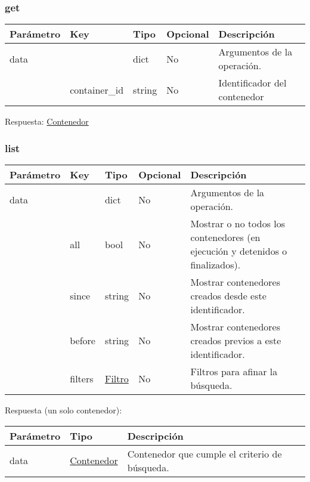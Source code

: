 		\pagebreak
		\subsubsection{get}
			\begin{table}[h!]
				\centering
	\begin{adjustbox}{max width=\textwidth}
				\begin{tabular}{|l|l|l|l|l|}
					\hline
					Parámetro & Key & Tipo & Opcional & Descripción \\ \hline
					data &  & dict & No & Argumentos de la operación. \\ \hline
					& container\_id & string & No & Identificador del contenedor \\ \hline
				\end{tabular}
\end{adjustbox}
			\end{table}
		
			Respuesta: \hyperref[sec:contenedor]{Contenedor}
			
		\subsubsection{list}
			\begin{table}[h!]
				\centering
	\begin{adjustbox}{max width=\textwidth}
				\begin{tabularx}{\linewidth}{|l|l|l|l|L|}
					\hline
					Parámetro & Key & Tipo & Opcional & Descripción \\ \hline
					data &  & dict & No & Argumentos de la operación. \\ \hline
					& all & bool & No & Mostrar o no todos los contenedores (en ejecución y detenidos o finalizados). \\ \hline
					& since & string & No & Mostrar contenedores creados desde este identificador. \\ \hline
					& before & string & No & Mostrar contenedores creados previos a este identificador. \\ \hline
					& filters & \hyperref[sec:filtrocontenedor]{Filtro} & No & Filtros para afinar la búsqueda. \\ \hline
				\end{tabularx}
\end{adjustbox}
			\end{table}
		
			Respuesta (un solo contenedor):
			\begin{table}[h!]
				\centering
	\begin{adjustbox}{max width=\textwidth}
				\begin{tabular}{|l|l|l|}
					\hline
					Parámetro & Tipo & Descripción \\ \hline
					data & \hyperref[sec:contenedor]{Contenedor} & Contenedor que cumple el criterio de búsqueda. \\ \hline
				\end{tabular}
\end{adjustbox}
			\end{table}
		
